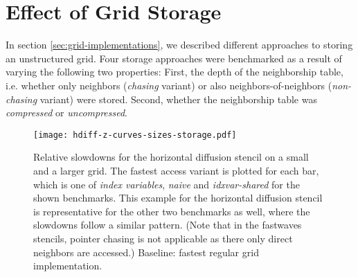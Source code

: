 \section{Effect of Grid Storage} \label{sec:res-storage}

In section \ref{sec:grid-implementations}, we described different approaches to storing an unstructured grid. Four storage approaches were benchmarked as a result of varying the following two properties: First, the depth of the neighborship table, i.e. whether only neighbors (\emph{chasing} variant) or also neighbors-of-neighbors (\emph{non-chasing} variant) were stored. Second, whether the neighborship table was \emph{compressed} or \emph{uncompressed}.

\begin{figure}
	\texttt{[image: hdiff-z-curves-sizes-storage.pdf]}
	\caption{\label{fig:hdiff-sizes-storage} Relative slowdowns for the horizontal diffusion stencil on a small and a larger grid. The fastest access variant is plotted for each bar, which is one of \emph{index variables}, \emph{naive} and \emph{idxvar-shared} for the shown benchmarks. This example for the horizontal diffusion stencil is representative for the other two benchmarks as well, where the slowdowns follow a similar pattern. (Note that in the fastwaves stencils, pointer chasing is not applicable as there only direct neighbors are accessed.) Baseline: fastest regular grid implementation.}
\end{figure}

